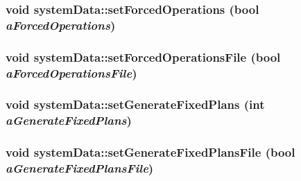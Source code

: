 \label{classsystem_data_a3e15f78d6dfa9485cfeda6b81478ed28}
\hypertarget{classsystem_data_ae9c09de52aee3e937053fdb9c821fc3a}{
\subsubsection[{setForcedOperations}]{\setlength{\rightskip}{0pt plus 5cm}void systemData::setForcedOperations (bool {\em aForcedOperations})}}
\label{classsystem_data_ae9c09de52aee3e937053fdb9c821fc3a}
\hypertarget{classsystem_data_a5befeffba89c8a0a9623ae902e2ccff8}{
\subsubsection[{setForcedOperationsFile}]{\setlength{\rightskip}{0pt plus 5cm}void systemData::setForcedOperationsFile (bool {\em aForcedOperationsFile})}}
\label{classsystem_data_a5befeffba89c8a0a9623ae902e2ccff8}
\hypertarget{classsystem_data_ac2a39af905cb5a718c78d785bb6f1e4f}{
\subsubsection[{setGenerateFixedPlans}]{\setlength{\rightskip}{0pt plus 5cm}void systemData::setGenerateFixedPlans (int {\em aGenerateFixedPlans})}}
\label{classsystem_data_ac2a39af905cb5a718c78d785bb6f1e4f}
\hypertarget{classsystem_data_a5edc4dc1a1d3e695410c647221647076}{
\subsubsection[{setGenerateFixedPlansFile}]{\setlength{\rightskip}{0pt plus 5cm}void systemData::setGenerateFixedPlansFile (bool {\em aGenerateFixedPlansFile})}}
